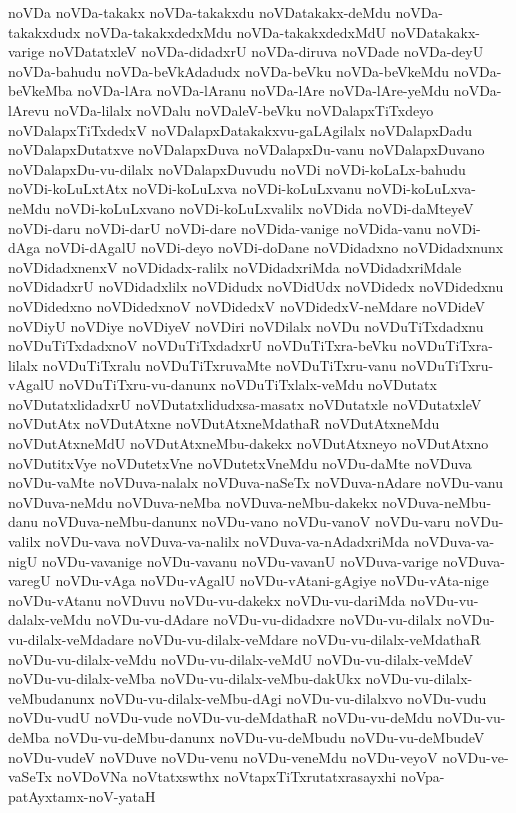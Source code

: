 {noVDa
noVDa-takakx
noVDa-takakxdu
noVDatakakx-deMdu
noVDa-takakxdudx
noVDa-takakxdedxMdu
noVDa-takakxdedxMdU
noVDatakakx-varige
noVDatatxleV
noVDa-didadxrU
noVDa-diruva
noVDade
noVDa-deyU
noVDa-bahudu
noVDa-beVkAdadudx
noVDa-beVku
noVDa-beVkeMdu
noVDa-beVkeMba
noVDa-lAra
noVDa-lAranu
noVDa-lAre
noVDa-lAre-yeMdu
noVDa-lArevu
noVDa-lilalx
noVDalu
noVDaleV-beVku
noVDalapxTiTxdeyo
noVDalapxTiTxdedxV
noVDalapxDatakakxvu-gaLAgilalx
noVDalapxDadu
noVDalapxDutatxve
noVDalapxDuva
noVDalapxDu-vanu
noVDalapxDuvano
noVDalapxDu-vu-dilalx
noVDalapxDuvudu
noVDi
noVDi-koLaLx-bahudu
noVDi-koLuLxtAtx
noVDi-koLuLxva
noVDi-koLuLxvanu
noVDi-koLuLxva-neMdu
noVDi-koLuLxvano
noVDi-koLuLxvalilx
noVDida
noVDi-daMteyeV
noVDi-daru
noVDi-darU
noVDi-dare
noVDida-vanige
noVDida-vanu
noVDi-dAga
noVDi-dAgalU
noVDi-deyo
noVDi-doDane
noVDidadxno
noVDidadxnunx
noVDidadxnenxV
noVDidadx-ralilx
noVDidadxriMda
noVDidadxriMdale
noVDidadxrU
noVDidadxlilx
noVDidudx
noVDidUdx
noVDidedx
noVDidedxnu
noVDidedxno
noVDidedxnoV
noVDidedxV
noVDidedxV-neMdare
noVDideV
noVDiyU
noVDiye
noVDiyeV
noVDiri
noVDilalx
noVDu
noVDuTiTxdadxnu
noVDuTiTxdadxnoV
noVDuTiTxdadxrU
noVDuTiTxra-beVku
noVDuTiTxra-lilalx
noVDuTiTxralu
noVDuTiTxruvaMte
noVDuTiTxru-vanu
noVDuTiTxru-vAgalU
noVDuTiTxru-vu-danunx
noVDuTiTxlalx-veMdu
noVDutatx
noVDutatxlidadxrU
noVDutatxlidudxsa-masatx
noVDutatxle
noVDutatxleV
noVDutAtx
noVDutAtxne
noVDutAtxneMdathaR
noVDutAtxneMdu
noVDutAtxneMdU
noVDutAtxneMbu-dakekx
noVDutAtxneyo
noVDutAtxno
noVDutitxVye
noVDutetxVne
noVDutetxVneMdu
noVDu-daMte
noVDuva
noVDu-vaMte
noVDuva-nalalx
noVDuva-naSeTx
noVDuva-nAdare
noVDu-vanu
noVDuva-neMdu
noVDuva-neMba
noVDuva-neMbu-dakekx
noVDuva-neMbu-danu
noVDuva-neMbu-danunx
noVDu-vano
noVDu-vanoV
noVDu-varu
noVDu-valilx
noVDu-vava
noVDuva-va-nalilx
noVDuva-va-nAdadxriMda
noVDuva-va-nigU
noVDu-vavanige
noVDu-vavanu
noVDu-vavanU
noVDuva-varige
noVDuva-varegU
noVDu-vAga
noVDu-vAgalU
noVDu-vAtani-gAgiye
noVDu-vAta-nige
noVDu-vAtanu
noVDuvu
noVDu-vu-dakekx
noVDu-vu-dariMda
noVDu-vu-dalalx-veMdu
noVDu-vu-dAdare
noVDu-vu-didadxre
noVDu-vu-dilalx
noVDu-vu-dilalx-veMdadare
noVDu-vu-dilalx-veMdare
noVDu-vu-dilalx-veMdathaR
noVDu-vu-dilalx-veMdu
noVDu-vu-dilalx-veMdU
noVDu-vu-dilalx-veMdeV
noVDu-vu-dilalx-veMba
noVDu-vu-dilalx-veMbu-dakUkx
noVDu-vu-dilalx-veMbudanunx
noVDu-vu-dilalx-veMbu-dAgi
noVDu-vu-dilalxvo
noVDu-vudu
noVDu-vudU
noVDu-vude
noVDu-vu-deMdathaR
noVDu-vu-deMdu
noVDu-vu-deMba
noVDu-vu-deMbu-danunx
noVDu-vu-deMbudu
noVDu-vu-deMbudeV
noVDu-vudeV
noVDuve
noVDu-venu
noVDu-veneMdu
noVDu-veyoV
noVDu-ve-vaSeTx
noVDoVNa
noVtatxswthx
noVtapxTiTxrutatxrasayxhi
noVpa-patAyxtamx-noV-yataH
}
